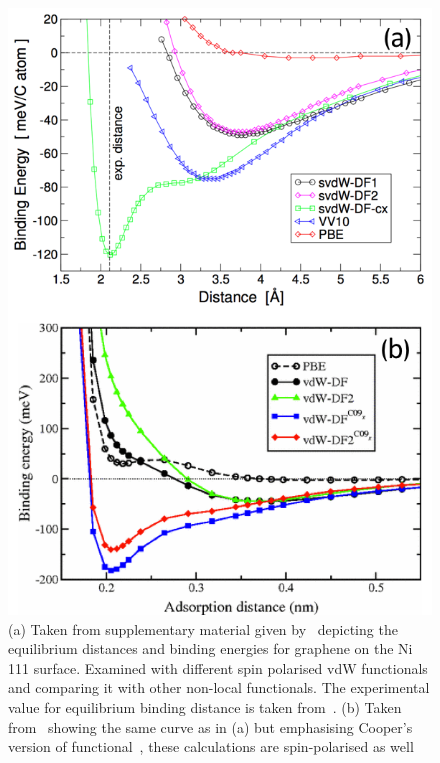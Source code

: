 \begin{figure}
    \centering
    \includegraphics[scale=1.0,keepaspectratio]{Figs/svdW.png}
    \caption{(a) Taken from supplementary material given by~\cite{Thonhauser2015PRL} depicting the equilibrium distances and binding energies for graphene on the Ni 111 surface. Examined with different spin polarised vdW functionals and comparing it with other non-local functionals. The experimental value for equilibrium binding distance is taken from~\cite{Gamo1997}. (b) Taken from~\cite{Hamada2010} showing the same curve as in (a) but emphasising Cooper's version of functional~\cite{Cooper2010}, these calculations are spin-polarised as well}
    \label{fig:svdW}
\end{figure}

